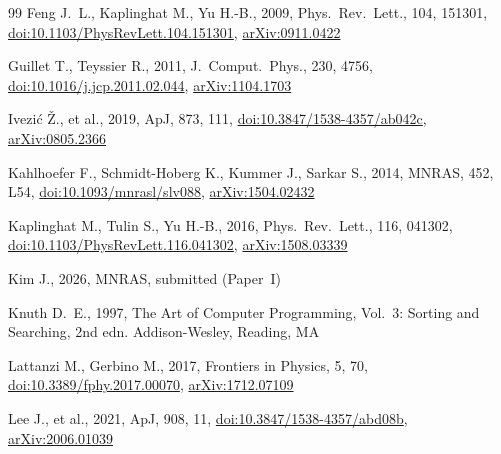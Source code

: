\documentclass[fleqn,usenatbib]{mnras}
\begin{document}
\begin{thebibliography}{99}
Feng J.~L., Kaplinghat M., Yu H.-B., 2009, Phys.\ Rev.\ Lett., 104, 151301,
\href{https://doi.org/10.1103/PhysRevLett.104.151301}{doi:10.1103/PhysRevLett.104.151301},
\href{https://arxiv.org/abs/0911.0422}{arXiv:0911.0422}

Guillet T., Teyssier R., 2011, J.\ Comput.\ Phys., 230, 4756,
\href{https://doi.org/10.1016/j.jcp.2011.02.044}{doi:10.1016/j.jcp.2011.02.044},
\href{https://arxiv.org/abs/1104.1703}{arXiv:1104.1703}

Ivezi{\'c} {\v Z}., et al., 2019, ApJ, 873, 111,
\href{https://doi.org/10.3847/1538-4357/ab042c}{doi:10.3847/1538-4357/ab042c},
\href{https://arxiv.org/abs/0805.2366}{arXiv:0805.2366}

Kahlhoefer F., Schmidt-Hoberg K., Kummer J., Sarkar S., 2014, MNRAS, 452, L54,
\href{https://doi.org/10.1093/mnrasl/slv088}{doi:10.1093/mnrasl/slv088},
\href{https://arxiv.org/abs/1504.02432}{arXiv:1504.02432}

Kaplinghat M., Tulin S., Yu H.-B., 2016, Phys.\ Rev.\ Lett., 116, 041302,
\href{https://doi.org/10.1103/PhysRevLett.116.041302}{doi:10.1103/PhysRevLett.116.041302},
\href{https://arxiv.org/abs/1508.03339}{arXiv:1508.03339}

Kim J., 2026, MNRAS, submitted (Paper~I)

Knuth D.~E., 1997, The Art of Computer Programming, Vol.~3:
Sorting and Searching, 2nd edn. Addison-Wesley, Reading, MA

Lattanzi M., Gerbino M., 2017, Frontiers in Physics, 5, 70,
\href{https://doi.org/10.3389/fphy.2017.00070}{doi:10.3389/fphy.2017.00070},
\href{https://arxiv.org/abs/1712.07109}{arXiv:1712.07109}

Lee J., et al., 2021, ApJ, 908, 11,
\href{https://doi.org/10.3847/1538-4357/abd08b}{doi:10.3847/1538-4357/abd08b},
\href{https://arxiv.org/abs/2006.01039}{arXiv:2006.01039}


\end{thebibliography}
\end{document}
